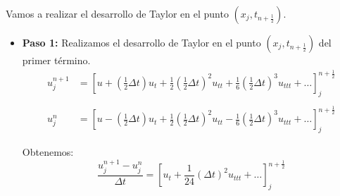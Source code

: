 \documentclass[spanish]{mathnotes}
\begin{document}
	Vamos a realizar el desarrollo de Taylor en el punto $\left(x_j, t_{n+\frac{1}{2}}\right)$.
	
	\begin{itemize}
			\item  \textbf{Paso 1:} Realizamos el desarrollo de Taylor en el punto $\left(x_j, t_{n+\frac{1}{2}}\right)$ del primer término.
			\begin{align*}
			u_{j}^{n+1} & = \left[u + \left(\frac{1}{2}\Delta t\right)u_t + \frac{1}{2}\left(\frac{1}{2}\Delta t\right)^2u_{tt} + \frac{1}{6}\left(\frac{1}{2}\Delta t\right)^3u_{ttt} + \hdots \right]_j^{n+\frac{1}{2}}\\\\
			u_{j}^{n} & = \left[u - \left(\frac{1}{2}\Delta t\right)u_t + \frac{1}{2}\left(\frac{1}{2}\Delta t\right)^2u_{tt} - \frac{1}{6}\left(\frac{1}{2}\Delta t\right)^3u_{ttt} + \hdots \right]_j^{n+\frac{1}{2}}
			\end{align*}
			
			Obtenemos:	
			$$\frac{u_j^{n+1}-u_j^n}{\Delta t} = \left[u_t+\frac{1}{24}(\Delta t)^2u_{ttt}+\hdots \right]_j^{n+\frac{1}{2}}$$
			

\end{itemize}
\end{document}
